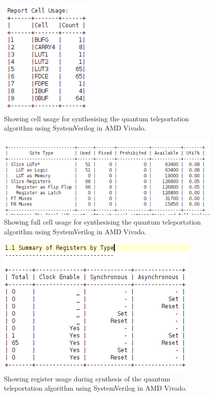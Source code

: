 \begin{figure}[!ht]
	\centering
	\includegraphics[width=0.45\linewidth]{body/ch6/figs/qta-resources}
	\caption[Showing Results from Synthesis of the Quantum Teleportation Algorithm]{Showing cell usage for synthesising the quantum teleportation algorithm using SystemVerilog in AMD Vivado.}
	\label{fig:qta-1}
\end{figure}

\begin{figure}[!ht]
	\centering
	\includegraphics[width=0.45\linewidth]{body/ch6/figs/qta-resources-full}
	\caption[Showing Results from Synthesis of the Quantum Teleportation Algorithm]{Showing full cell usage for synthesising the quantum teleportation algorithm using SystemVerilog in AMD Vivado.}
\label{fig:qta-2}
\end{figure}

\begin{figure}[!ht]
	\centering
	\includegraphics[width=0.45\linewidth]{body/ch6/figs/qta-registers}
	\caption[Showing Results from Synthesis of the Quantum Teleportation Algorithm]{Showing register usage during synthesis of the quantum teleportation algorithm using SystemVerilog in AMD Vivado.}
\label{fig:qta-3}
\end{figure}

